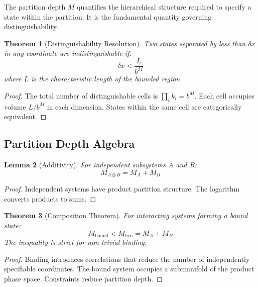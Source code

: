\documentclass[twocolumn,amsmath,amssymb,aps,prl,superscriptaddress]{revtex4-2}
\newtheorem{theorem}{Theorem}[section]
\newtheorem{lemma}[theorem]{Lemma}
\newcommand{\Mpart}{M}
\begin{document}
The partition depth $\Mpart$ quantifies the hierarchical structure required to specify a state within the partition. It is the fundamental quantity governing distinguishability.

\begin{theorem}[Distinguishability Resolution]
\label{thm:resolution}
Two states separated by less than $\delta x$ in any coordinate are indistinguishable if:
\begin{equation}
\delta x < \frac{L}{b^{\Mpart}}
\end{equation}
where $L$ is the characteristic length of the bounded region.
\end{theorem}

\begin{proof}
The total number of distinguishable cells is $\prod_i k_i = b^{\Mpart}$. Each cell occupies volume $L/b^{\Mpart}$ in each dimension. States within the same cell are categorically equivalent.
\end{proof}

\subsection{Partition Depth Algebra}

\begin{lemma}[Additivity]
For independent subsystems A and B:
\begin{equation}
\Mpart_{A \otimes B} = \Mpart_A + \Mpart_B
\end{equation}
\end{lemma}

\begin{proof}
Independent systems have product partition structure. The logarithm converts products to sums.
\end{proof}

\begin{theorem}[Composition Theorem]
\label{thm:composition}
For interacting systems forming a bound state:
\begin{equation}
\boxed{\Mpart_{\text{bound}} < \Mpart_{\text{free}} = \Mpart_A + \Mpart_B}
\end{equation}
The inequality is strict for non-trivial binding.
\end{theorem}

\begin{proof}
Binding introduces correlations that reduce the number of independently specifiable coordinates. The bound system occupies a submanifold of the product phase space. Constraints reduce partition depth.
\end{proof}
\end{document}
